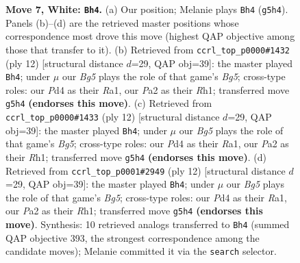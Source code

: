 \documentclass[11pt]{article}
\begin{document}
\begin{figure}[p]
\caption{\textbf{Move 7, White: \texttt{Bh4}.} (a) Our position; Melanie plays \texttt{Bh4} (\texttt{g5h4}). Panels (b)--(d) are the retrieved master positions whose correspondence most drove this move (highest QAP objective among those that transfer to it). (b) Retrieved from \texttt{ccrl\_top\_p0000\#1432} (ply 12) [structural distance $d$=29, QAP obj=39]: the master played \texttt{Bh4}; under $\mu$ our \emph{Bg5} plays the role of that game's \emph{Bg5}; cross-type roles: our \emph{P}d4 as their \emph{R}a1, our \emph{P}a2 as their \emph{R}h1; transferred move \texttt{g5h4} \textbf{(endorses this move)}. (c) Retrieved from \texttt{ccrl\_top\_p0000\#1433} (ply 12) [structural distance $d$=29, QAP obj=39]: the master played \texttt{Bh4}; under $\mu$ our \emph{Bg5} plays the role of that game's \emph{Bg5}; cross-type roles: our \emph{P}d4 as their \emph{R}a1, our \emph{P}a2 as their \emph{R}h1; transferred move \texttt{g5h4} \textbf{(endorses this move)}. (d) Retrieved from \texttt{ccrl\_top\_p0001\#2949} (ply 12) [structural distance $d$=29, QAP obj=39]: the master played \texttt{Bh4}; under $\mu$ our \emph{Bg5} plays the role of that game's \emph{Bg5}; cross-type roles: our \emph{P}d4 as their \emph{R}a1, our \emph{P}a2 as their \emph{R}h1; transferred move \texttt{g5h4} \textbf{(endorses this move)}. Synthesis: 10 retrieved analogs transferred to \texttt{Bh4} (summed QAP objective 393, the strongest correspondence among the candidate moves); Melanie committed it via the \texttt{search} selector.}
\label{fig:thought-m12}
\end{figure}

\clearpage
\end{document}

